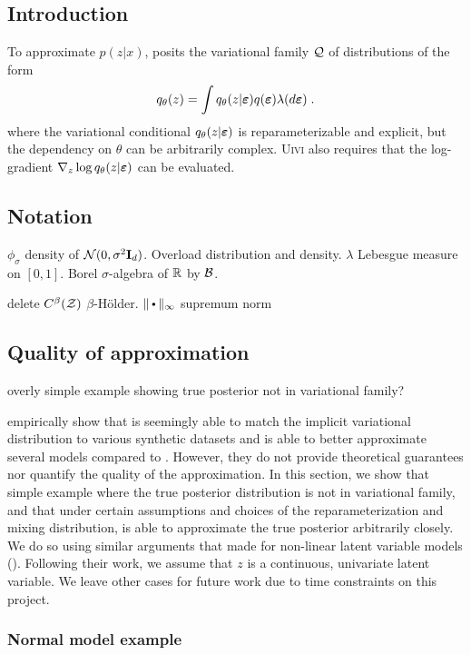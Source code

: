 \documentclass[10pt]{article}
\begin{document}
\subsection{Introduction}

\todo

To approximate $p(z|x)$, \uivi posits the variational family $\mathcal{Q}$ of distributions of the form
\[
q_\theta(z) = \int q_\theta(z|\bm{\varepsilon})q(\bm{\varepsilon})\lambda(d\bm{\varepsilon}) \;.
\]
where the variational conditional $q_\theta(z|\bm{\varepsilon})$ is reparameterizable and explicit, but the dependency on $\theta$ can be arbitrarily complex. \textsc{Uivi} also requires that the log-gradient $\nabla_z\log q_\theta(z|\bm{\varepsilon})$ can be evaluated.


\subsection{Notation}

\todo $\phi_\sigma$ density of $\mathcal{N}(0,\sigma^2\mathbf{I}_d)$. Overload distribution and density. $\lambda$ Lebesgue measure on $[0,1]$. Borel $\sigma$-algebra of $\mathbb{R}$ by $\mathcal{B}$. 

\todo delete $C^\beta(\mathcal{Z})$ $\beta$-H\"{o}lder. $\|\argdot\|_\infty$ supremum norm

\subsection{Quality of approximation}

\todo overly simple example showing true posterior not in variational family?

\citet{Titsias:2019} empirically show that \uivi is seemingly able to match the implicit variational distribution to various synthetic datasets and is able to better approximate several models compared to \sivi. However, they do not provide theoretical guarantees nor quantify the quality of the \uivi approximation. In this section, we show that \todo simple example where the true posterior distribution is not in variational family, and that under certain assumptions and choices of the reparameterization and mixing distribution, \uivi is able to approximate the true posterior arbitrarily closely. We do so using similar arguments that \citet{Plummer:2021} made for non-linear latent variable models (\nllvm). Following their work, we assume that $z$ is a continuous, univariate latent variable. We leave other cases for future work due to time constraints on this project.

\subsubsection{Normal model example}
\end{document}
